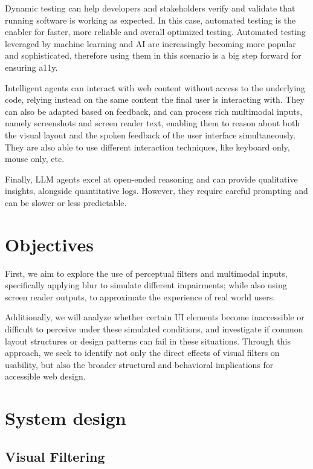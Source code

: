 Dynamic testing can help developers and stakeholders verify and validate that running software is working as expected\cite{vasquez2018continuous}. In this case, automated testing is the enabler for faster, more reliable and overall optimized testing. Automated testing leveraged by machine learning and \ac{AI} are increasingly becoming more popular and sophisticated, therefore using them in this scenario is a big step forward for ensuring \ac{a11y}.

Intelligent agents can interact with web content without access to the underlying code, relying instead on the same content the final user is interacting with\cite{lanham2025ai, wang2024survey, lu2025uxagent}. They can also be adapted based on feedback, and can process rich multimodal inputs, namely screenshots and screen reader text, enabling them to reason about both the visual layout and the spoken feedback of the user interface simultaneously. They are also able to use different interaction techniques, like keyboard only, mouse only, etc. 

Finally, LLM agents excel at open-ended reasoning and can provide qualitative insights, alongside quantitative logs. However, they require careful prompting and can be slower or less predictable.
\vspace{-8pt}

\section{Objectives}

First, we aim to explore the use of perceptual filters and multimodal inputs, specifically applying blur to simulate different impairments; while also using screen reader outputs, to approximate the experience of real world users. 

Additionally, we will analyze whether certain \ac{UI} elements become inaccessible or difficult to perceive under these simulated conditions, and investigate if common layout structures or design patterns can fail in these situations. Through this approach, we seek to identify not only the direct effects of visual filters on usability, but also the broader structural and behavioral implications for accessible web design.

\section{System design}
\subsection{Visual Filtering}

